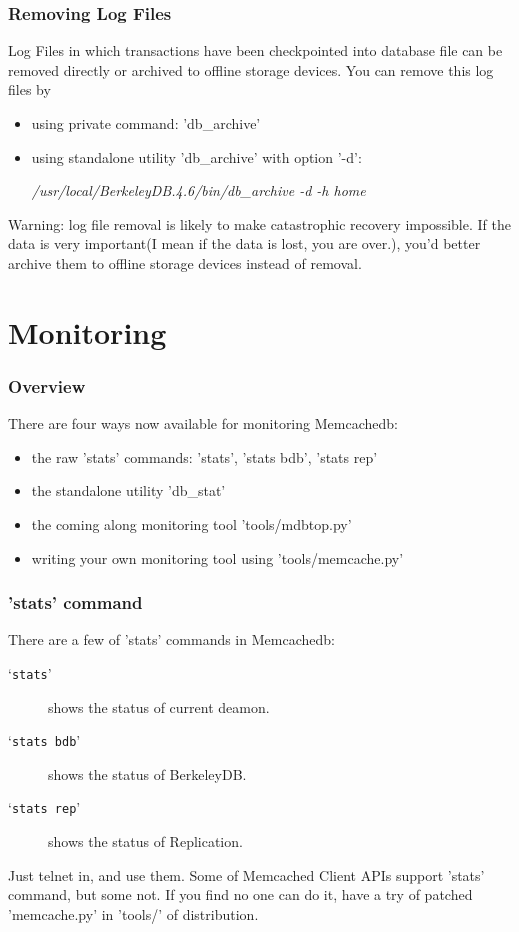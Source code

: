 \documentclass{beamer}
\newcommand{\command}[1]{`\texttt{#1}'}
\newcommand{\mysection}[1]{\section{#1}\frame{\frametitle{#1}\tableofcontents[sectionstyle=show/shaded,subsectionstyle=show/shaded/shaded]}}
\begin{document}
\begin{frame}
\frametitle{Removing Log Files}
Log Files in which transactions have been checkpointed into database file can be removed directly or archived to offline storage devices. You can remove this log files by 
\begin{itemize}
\item using private command: 'db\_archive' 
\item using standalone utility 'db\_archive' with option '-d':
\begin{block}{}
\begin{semiverbatim}
 \textit{/usr/local/BerkeleyDB.4.6/bin/db\_archive -d -h home}
\end{semiverbatim}
\end{block}
\end{itemize}
\alert{Warning:} log file removal is likely to make catastrophic recovery impossible. If the data is very important(I mean if the data is lost, you are over.), you'd better archive them to offline storage devices instead of removal.
\end{frame}

\mysection{Monitoring}
\begin{frame}
\frametitle{Overview}
There are four ways now available for monitoring Memcachedb:
\begin{itemize}
\item the raw 'stats' commands: 'stats', 'stats bdb', 'stats rep'
\item the standalone utility 'db\_stat'
\item the coming along monitoring tool 'tools/mdbtop.py'
\item writing your own monitoring tool using 'tools/memcache.py'
\end{itemize}
\end{frame}

\begin{frame}
\frametitle{'stats' command}
There are a few of 'stats' commands in Memcachedb:
\begin{description}
\item[\command{stats}]
shows the status of current deamon.
\item[\command{stats bdb}]
shows the status of BerkeleyDB.
\item[\command{stats rep}]
shows the status of Replication.
\end{description}

Just telnet in, and use them. Some of Memcached Client APIs support 'stats' command, but some not. 
If you find no one can do it, have a try of patched 'memcache.py' in 'tools/' of distribution.
\end{frame}
\end{document}
